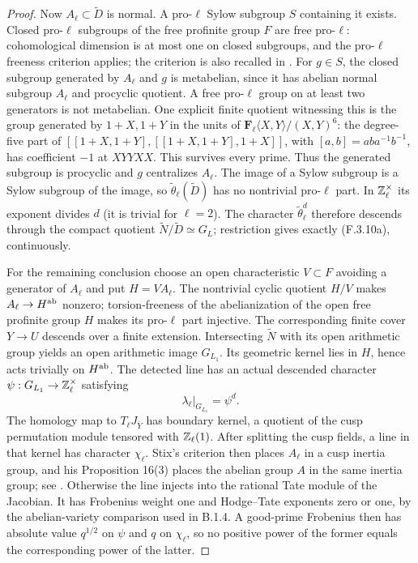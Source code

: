 \begin{proof}
Now $A_\ell\subset\widetilde D$ is normal. A pro-$\ell$
Sylow subgroup $S$ containing it exists. Closed pro-$\ell$
subgroups of the free profinite group $F$ are free pro-$\ell$:
cohomological dimension is at most one on closed subgroups,
and the pro-$\ell$ freeness criterion applies; the criterion
is also recalled in \cite[\S1.5, Lemma 1.7 and the proof of
Proposition 1.6]{AuditGille2000}. For $g\in S$, the closed
subgroup generated by $A_\ell$ and $g$ is metabelian, since
it has abelian normal subgroup $A_\ell$ and procyclic quotient.
A free pro-$\ell$ group on at least two generators is not
metabelian. One explicit finite quotient witnessing this is
the group generated by $1+X,1+Y$ in the units of
$\mathbf F_\ell\langle X,Y\rangle/(X,Y)^6$:
the degree-five part of
$[[1+X,1+Y],[[1+X,1+Y],1+X]]$, with $[a,b]=aba^{-1}b^{-1}$,
has coefficient $-1$
at $XYYXX$. This survives every prime. Thus the generated
subgroup is procyclic and $g$ centralizes $A_\ell$.
The image of a Sylow subgroup is a Sylow subgroup of the
image, so $\widetilde\theta_\ell(\widetilde D)$ has no
nontrivial pro-$\ell$ part. In $\mathbb Z_\ell^\times$ its exponent
divides $d$ (it is trivial for $\ell=2$). The character
$\widetilde\theta_\ell^d$ therefore descends through the
compact quotient $\widetilde N/\widetilde D\simeq G_L$;
restriction gives exactly (F.3.10a), continuously.

For the remaining conclusion choose an open characteristic
$V\subset F$ avoiding a generator of $A_\ell$ and put
$H=VA_\ell$. The nontrivial cyclic quotient $H/V$ makes
$A_\ell\to H^{\rm ab}$ nonzero; torsion-freeness of the
abelianization of the open free profinite group $H$ makes
its pro-$\ell$ part injective. The corresponding finite cover
$Y\to U$ descends over a finite extension. Intersecting
$\widetilde N$ with its open arithmetic group yields an
open arithmetic image $G_{L_1}$. Its geometric kernel lies
in $H$, hence acts trivially on $H^{\rm ab}$. The detected
line has an actual descended character
$\psi:G_{L_1}\to\mathbb Z_\ell^\times$ satisfying
\[
              \lambda_\ell|_{G_{L_1}}=\psi^d.
 \tag{F.3.10b}
\]
The homology map to $T_\ell J_{\overline Y}$ has boundary
kernel, a quotient of the cusp permutation module tensored
with $\mathbb Z_\ell(1)$. After splitting the cusp fields, a line
in that kernel has character $\chi_\ell$. Stix's criterion
then places $A_\ell$ in a cusp inertia group, and his
Proposition 16(3) places the abelian group $A$ in the same
inertia group; see \cite[Proposition 16, Definition 29 and
Theorem 30]{AuditStix2012}. Otherwise the line injects into
the rational Tate module of the Jacobian. It has Frobenius
weight one and Hodge--Tate exponents zero or one, by the
abelian-variety comparison used in B.1.4. A good-prime
Frobenius then has absolute value $q^{1/2}$ on $\psi$ and
$q$ on $\chi_\ell$, so no positive power of the former
equals the corresponding power of the latter.


\end{proof}
